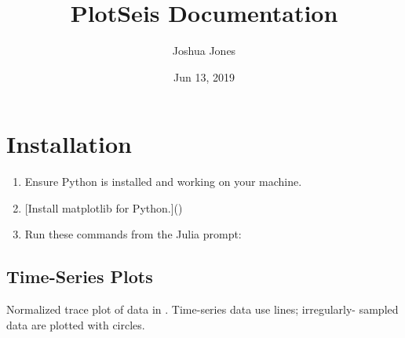 \documentclass[letterpaper,10pt,english]{sphinxmanual}
\title{PlotSeis Documentation}
\date{Jun 13, 2019}
\author{Joshua Jones}
\begin{document}
\pagestyle{empty}
\sphinxmaketitle
\pagestyle{plain}
\sphinxtableofcontents
\pagestyle{normal}
\label{\detokenize{index::doc}}



\chapter{Installation}
\label{\detokenize{index:installation}}\begin{enumerate}
\def\theenumi{\arabic{enumi}}
\def\labelenumi{\theenumi .}
\makeatletter\def\p@enumii{\p@enumi \theenumi .}\makeatother
\item {} 
Ensure Python is installed and working on your machine.

\item {} 
{[}Install matplotlib for Python.{]}()

\item {} 
Run these commands from the Julia prompt:

\end{enumerate}

\begin{sphinxVerbatim}[commandchars=\\\{\}]
\PYG{p}{]}
 
 
\end{sphinxVerbatim}


\section{Time-Series Plots}
\label{\detokenize{ts:time-series-plots}}\label{\detokenize{ts::doc}}

\begin{fulllineitems}
\label{\detokenize{ts:plotseis}}
\end{fulllineitems}


Normalized trace plot of data in . Time-series data use lines; irregularly-
sampled data are plotted with circles.
\end{document}
